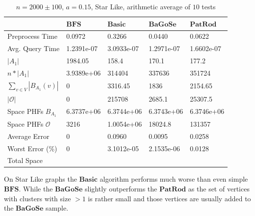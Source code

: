 \documentclass[shortabstract, lic, english]{iithesis}
\theoremstyle{definition} \newtheorem{definition}{Definition}[chapter]
\theoremstyle{remark} \newtheorem{remark}[definition]{Observation}
\theoremstyle{plain} \newtheorem{theorem}[definition]{Theorem}
\theoremstyle{plain} \newtheorem{lemma}[definition]{Lemma}
\theoremstyle{plain} \newtheorem{conjecture}[definition]{Conjecture}
\begin{document}
\begin{table}[H]
    \centering
    \begin{tabular}{ |p{3cm}||p{2cm}|p{2cm}|p{2cm}|p{2cm}|  } 
        \hline
        & $\mathbf{BFS}$ & $\mathbf{Basic}$ & $\mathbf{BaGoSe}$ & $\mathbf{PatRod}$ \\
        \hline
        \hline
        Preprocess Time                 & 0.0972     & 0.3266     & 0.0440      & 0.0622     \\
        \hline
        Avg. Query Time                 & 1.2391e-07 & 3.0933e-07 & 1.2971e-07  & 1.6602e-07 \\
        \hline
        $|A_1|$                         & 1984.05    & 158.4      & 170.1       & 177.2      \\
        \hline
        $n * |A_1|$                     & 3.9389e+06 & 314404     & 337636      & 351724     \\
        \hline
        $\sum_{v \in V} |B_{A_1}(v)| $  & 0          & 3316.45    & 1836        & 2154.65    \\
        \hline
        $|\mathcal{O}|$                 & 0          & 215708     & 2685.1      & 25307.5    \\
        \hline
        Space PHFs $B_{A_1}$            & 6.3737e+06 & 6.3744e+06 & 6.3743e+06  & 6.3746e+06 \\
        \hline
        Space PHFs $\mathcal{O}$        & 3216       & 1.0054e+06 & 18024.8     & 131357     \\
        \hline
        Average Error                   & 0          & 0.0960     & 0.0095      & 0.0258     \\
        \hline
        Worst Error (\%)                & 0          & 3.1012e-05 & 2.1535e-06  & 0.0128     \\
        \hline
        Total Space                     &            &            &             &            \\
        \hline

    \end{tabular}
    \caption{$n = 2000 \pm 100$, $a = 0.15$, Star Like, arithmetic average of $10$ tests}
\end{table}

On Star Like graphs the $\mathbf{Basic}$ algorithm performs much worse than even simple $\mathbf{BFS}$.
While the $\mathbf{BaGoSe}$ slightly outperforms the $\mathbf{PatRod}$ as the set of vertices with clusters with size $>1$
is rather small and those vertices are usually added to the $\mathbf{BaGoSe}$ sample.
\end{document}
